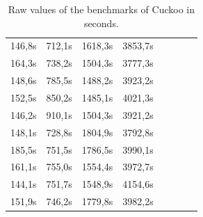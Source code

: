 \documentclass{scrartcl}
\begin{document}
\begin{table}[h]
\begin{tabular}{@{}llllllll@{}}
 \multicolumn{1}{r}{146,8s} & \multicolumn{1}{r}{712,1s} & \multicolumn{1}{r}{1618,3s} & \multicolumn{1}{r}{3853,7s} \\
 \multicolumn{1}{r}{164,3s} & \multicolumn{1}{r}{738,2s} & \multicolumn{1}{r}{1504,3s} & \multicolumn{1}{r}{3777,3s} \\
 \multicolumn{1}{r}{148,6s} & \multicolumn{1}{r}{785,5s} & \multicolumn{1}{r}{1488,2s} & \multicolumn{1}{r}{3923,2s} \\
 \multicolumn{1}{r}{152,5s} & \multicolumn{1}{r}{850,2s} & \multicolumn{1}{r}{1485,1s} & \multicolumn{1}{r}{4021,3s} \\
 \multicolumn{1}{r}{146,2s} & \multicolumn{1}{r}{910,1s} & \multicolumn{1}{r}{1504,3s} & \multicolumn{1}{r}{3921,2s} \\
 \multicolumn{1}{r}{148,1s} & \multicolumn{1}{r}{728,8s} & \multicolumn{1}{r}{1804,9s} & \multicolumn{1}{r}{3792,8s} \\
 \multicolumn{1}{r}{185,5s} & \multicolumn{1}{r}{751,5s} & \multicolumn{1}{r}{1786,5s} & \multicolumn{1}{r}{3990,1s} \\
 \multicolumn{1}{r}{161,1s} & \multicolumn{1}{r}{755,0s} & \multicolumn{1}{r}{1554,4s} & \multicolumn{1}{r}{3972,7s} \\
 \multicolumn{1}{r}{144,1s} & \multicolumn{1}{r}{751,7s} & \multicolumn{1}{r}{1548,9s} & \multicolumn{1}{r}{4154,6s} \\
 \multicolumn{1}{r}{151,9s} & \multicolumn{1}{r}{746,2s} & \multicolumn{1}{r}{1779,8s} & \multicolumn{1}{r}{3982,2s} \\ \bottomrule
\end{tabular}
\caption{Raw values of the benchmarks of Cuckoo in seconds.}
\label{rawdata_cuckoo}
\end{table}
\end{document}
